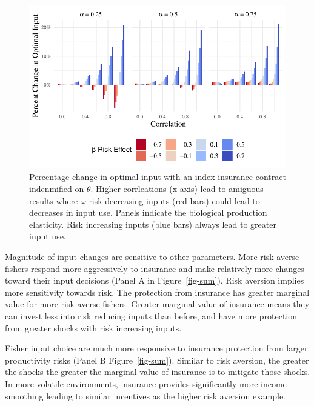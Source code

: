 \documentclass[
  letterpaper,
  DIV=11,
  numbers=noendperiod]{scrartcl}
\theoremstyle{plain}
\theoremstyle{plain}
\theoremstyle{remark}
\begin{document}
\begin{figure}

{\centering \includegraphics{ibi-behavior_files/figure-pdf/fig-corr-theta-1.pdf}

}

\caption{\label{fig-corr-theta}Percentage change in optimal input with
an index insurance contract indenmified on \(\theta\). Higher
corrleations (x-axis) lead to amiguous results where \(\omega\) risk
decreasing inputs (red bars) could lead to decreases in input use.
Panels indicate the biological production elasticity. Risk increasing
inputs (blue bars) always lead to greater input use.}

\end{figure}

Magnitude of input changes are sensitive to other parameters. More risk
averse fishers respond more aggressively to insurance and make
relatively more changes toward their input decisions (Panel A in
Figure~\ref{fig-sum}). Risk aversion implies more sensitivity towards
risk. The protection from insurance has greater marginal value for more
risk averse fishers. Greater marginal value of insurance means they can
invest less into risk reducing inputs than before, and have more
protection from greater shocks with risk increasing inputs.

Fisher input choice are much more responsive to insurance protection
from larger productivity risks (Panel B Figure~\ref{fig-sum}). Similar
to risk aversion, the greater the shocks the greater the marginal value
of insurance is to mitigate those shocks. In more volatile environments,
insurance provides significantly more income smoothing leading to
similar incentives as the higher risk aversion example.
\end{document}
